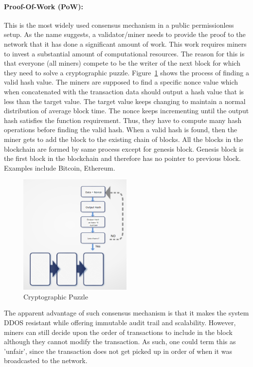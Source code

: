 \paragraph{Proof-Of-Work (PoW):} This is the most widely used consensus
mechanism in a public permissionless setup. As the name suggests, a
validator/miner needs to provide the proof to the network that it has done a
significant amount of work. This work requires miners to invest a substantial
amount of computational resources. The reason for this is that everyone (all
miners) compete to be the writer of the next block for which they need to solve
a cryptographic puzzle. Figure~\ref{fig:cryptographicPuzzle} shows the process of
finding a valid hash value. The miners are supposed to find a specific nonce
value which when concatenated with the transaction data should output a hash
value that is less than the target value. The target value keeps changing to
maintain a normal distribution of average block time. The nonce keeps
incrementing until the output hash satisfies the function requirement. Thus,
they have to compute many hash operations before finding the valid hash. When a
valid hash is found, then the miner gets to add the block to the existing chain
of blocks. All the blocks in the blockchain are formed by same process except
for genesis block. Genesis block is the first block in the blockchain and
therefore has no pointer to previous block. Examples include Bitcoin, Ethereum.
\begin{figure}
	\begin{center}
	\includegraphics[width=0.5\textwidth]{Images/CryptographicPuzzle.eps}
	\caption{Cryptographic Puzzle}
	\label{fig:cryptographicPuzzle}
	\end{center}
\end{figure}
The apparent advantage of such consensus mechanism is that it makes the
system DDOS resistant while offering immutable audit trail and
scalability.  However, miners can still decide upon the order of
transactions to include in the block although they cannot modify the
transaction. As such, one could term this as 'unfair', since the
transaction does not get picked up in order of when it was broadcasted
to the network. 
